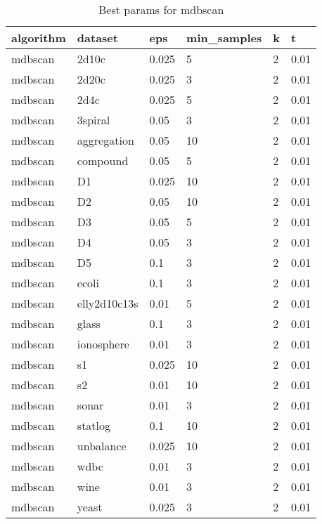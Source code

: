 \begin{table}[H]
\centering
\caption{Best params for mdbscan}
\label{S33_Table}
\begin{tabular}{|l|l|l|l|l|l|}
\hline
algorithm & dataset & eps & min\_samples & k & t \\
\hline
mdbscan & 2d10c & 0.025 & 5 & 2 & 0.01 \\
\hline
mdbscan & 2d20c & 0.025 & 3 & 2 & 0.01 \\
\hline
mdbscan & 2d4c & 0.025 & 5 & 2 & 0.01 \\
\hline
mdbscan & 3spiral & 0.05 & 3 & 2 & 0.01 \\
\hline
mdbscan & aggregation & 0.05 & 10 & 2 & 0.01 \\
\hline
mdbscan & compound & 0.05 & 5 & 2 & 0.01 \\
\hline
mdbscan & D1 & 0.025 & 10 & 2 & 0.01 \\
\hline
mdbscan & D2 & 0.05 & 10 & 2 & 0.01 \\
\hline
mdbscan & D3 & 0.05 & 5 & 2 & 0.01 \\
\hline
mdbscan & D4 & 0.05 & 3 & 2 & 0.01 \\
\hline
mdbscan & D5 & 0.1 & 3 & 2 & 0.01 \\
\hline
mdbscan & ecoli & 0.1 & 3 & 2 & 0.01 \\
\hline
mdbscan & elly2d10c13s & 0.01 & 5 & 2 & 0.01 \\
\hline
mdbscan & glass & 0.1 & 3 & 2 & 0.01 \\
\hline
mdbscan & ionosphere & 0.01 & 3 & 2 & 0.01 \\
\hline
mdbscan & s1 & 0.025 & 10 & 2 & 0.01 \\
\hline
mdbscan & s2 & 0.01 & 10 & 2 & 0.01 \\
\hline
mdbscan & sonar & 0.01 & 3 & 2 & 0.01 \\
\hline
mdbscan & statlog & 0.1 & 10 & 2 & 0.01 \\
\hline
mdbscan & unbalance & 0.025 & 10 & 2 & 0.01 \\
\hline
mdbscan & wdbc & 0.01 & 3 & 2 & 0.01 \\
\hline
mdbscan & wine & 0.01 & 3 & 2 & 0.01 \\
\hline
mdbscan & yeast & 0.025 & 3 & 2 & 0.01 \\
\hline
\end{tabular}
\end{table}

\clearpage

